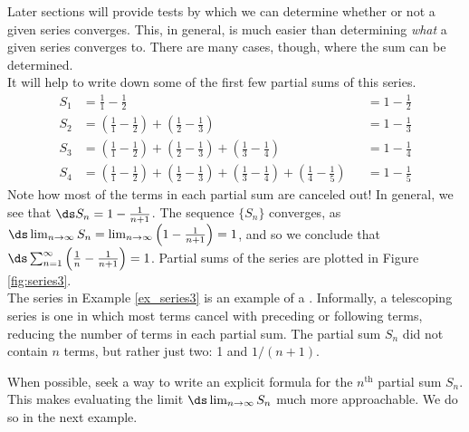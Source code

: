 Later sections will provide tests by which we can determine whether or not a given series converges. This, in general, is much easier than determining \emph{what} a given series converges to. There are many cases, though, where the sum can be determined. \\


{It will help to write down some of the first few partial sums of this series.
\begin{align*}
S_1 &=	\frac11-\frac12 & & = 1-\frac12\\
S_2 &=	\left(\frac11-\frac12\right) + \left(\frac12-\frac13\right) & & = 1-\frac13\\
S_3 &=	\left(\frac11-\frac12\right) + \left(\frac12-\frac13\right)+\left(\frac13-\frac14\right) & &= 1-\frac14\\
S_4 &=	\left(\frac11-\frac12\right) + \left(\frac12-\frac13\right)+\left(\frac13-\frac14\right) +\left(\frac14-\frac15\right)& &= 1-\frac15
\end{align*}
Note how most of the terms in each partial sum are canceled out! In general, we see that $\ds S_n = 1-\frac{1}{n+1}$. The sequence $\{S_n\}$ converges,  as $\ds \lim_{n\to\infty}S_n = \lim_{n\to\infty}\left(1-\frac1{n+1}\right) = 1$, and so we conclude that $\ds \sum_{n=1}^\infty \left(\frac1n-\frac1{n+1}\right) = 1$. Partial sums of the series are plotted in Figure \ref{fig:series3}.
}\\

The series in Example \ref{ex_series3} is an example of a . Informally, a telescoping series is one in which most terms cancel with preceding or following terms, reducing the number of terms in each partial sum. The partial sum $S_n$ did not contain $n$ terms, but rather just two: 1 and $1/(n+1)$.

When possible, seek a way to write an explicit formula for the $n^\text{th}$ partial sum $S_n$. This makes evaluating the limit $\ds\lim_{n\to\infty} S_n$ much more approachable. We do so in the next example.\\




